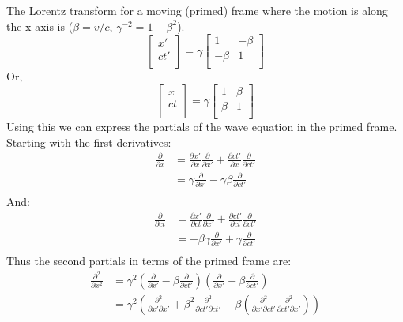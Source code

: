 The Lorentz transform for a moving (primed) frame where the motion is
along the x axis is (\(\beta = v/c\), \(\gamma^{-2} = 1 -\beta^2\)).
%
\begin{equation*}
\begin{bmatrix}
x' \\
c t' \\
\end{bmatrix}
=
\gamma
\begin{bmatrix}
1 & -\beta \\
-\beta & 1 \\
\end{bmatrix}
\end{equation*}
%
Or,
\begin{equation*}
\begin{bmatrix}
x \\
c t \\
\end{bmatrix}
=
\gamma
\begin{bmatrix}
1 & \beta \\
\beta & 1 \\
\end{bmatrix}
\end{equation*}
%
Using this we can express the partials of the wave equation in the
primed frame.  Starting with the first derivatives:
%
\begin{equation}\label{eqn:lorentz:160}
\begin{aligned}
\frac{\partial}{\partial x}
&= \frac{\partial x'}{\partial x} \frac{\partial}{\partial x'} + \frac{\partial c t'}{\partial x} \frac{\partial}{\partial c t'} \\
&= \gamma \frac{\partial}{\partial x'} - \gamma \beta \frac{\partial}{\partial c t'} \\
\end{aligned}
\end{equation}
%
And:
%
\begin{equation}\label{eqn:lorentz:180}
\begin{aligned}
\frac{\partial}{\partial ct}
&= \frac{\partial x'}{\partial ct} \frac{\partial}{\partial x'} + \frac{\partial c t'}{\partial ct} \frac{\partial}{\partial c t'} \\
&= -\beta \gamma \frac{\partial}{\partial x'} + \gamma \frac{\partial}{\partial c t'} \\
\end{aligned}
\end{equation}
%
Thus the second partials in terms of the primed frame are:
%
\begin{equation}\label{eqn:lorentz:200}
\begin{aligned}
\frac{\partial^2}{\partial x^2}
&= \gamma^2
\left(\frac{\partial}{\partial x'} - \beta \frac{\partial}{\partial c t'} \right)
\left(\frac{\partial}{\partial x'} - \beta \frac{\partial}{\partial c t'} \right)
\\
&= \gamma^2
\left(
\frac{\partial^2}{\partial x'\partial x'} + \beta^2 \frac{\partial^2}{\partial c t'\partial c t'}
- \beta \left(
\frac{\partial^2}{\partial x' \partial c t'}
\frac{\partial^2}{\partial c t' \partial x'}
\right)
\right)
\\
\end{aligned}
\end{equation}
